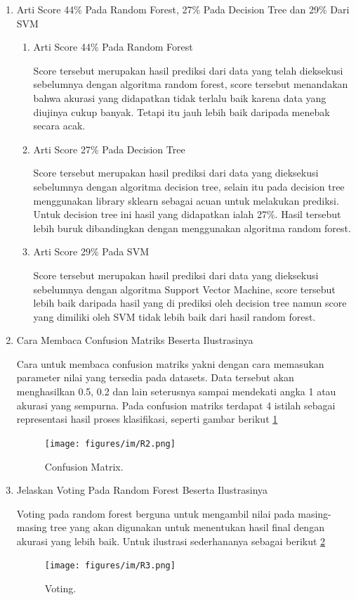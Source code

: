 \begin{enumerate}
\item Arti Score 44\% Pada Random Forest, 27\% Pada Decision Tree dan 29\% Dari SVM \par
\begin{enumerate}
\item Arti Score 44\% Pada Random Forest \par
Score tersebut merupakan hasil prediksi dari data yang telah dieksekusi sebelumnya dengan algoritma random forest, score tersebut menandakan bahwa akurasi yang didapatkan tidak terlalu baik karena data yang diujinya cukup banyak. Tetapi itu jauh lebih baik daripada menebak secara acak.
\item Arti Score 27\% Pada Decision Tree \par
Score tersebut merupakan hasil prediksi dari data yang dieksekusi sebelumnya dengan algoritma decision tree, selain itu pada decision tree menggunakan library sklearn sebagai acuan untuk melakukan prediksi. Untuk decision tree ini hasil yang didapatkan ialah 27\%. Hasil tersebut lebih buruk dibandingkan dengan menggunakan algoritma random forest.
\item Arti Score 29\% Pada SVM \par
Score tersebut merupakan hasil prediksi dari data yang dieksekusi sebelumnya dengan algoritma Support Vector Machine, score tersebut lebih baik daripada hasil yang di prediksi oleh decision tree namun score yang dimiliki oleh SVM tidak lebih baik dari hasil random forest.
\end{enumerate}

\item Cara Membaca Confusion Matriks Beserta Ilustrasinya \par
Cara untuk membaca confusion matriks yakni dengan cara memasukan parameter nilai yang tersedia pada datasets. Data tersebut akan  menghasilkan 0.5, 0.2 dan lain seterusnya sampai mendekati angka 1 atau akurasi yang sempurna. Pada confusion matriks terdapat 4 istilah sebagai representasi hasil proses klasifikasi, seperti gambar berikut \ref{R2}
		\begin{figure}[ht]
		\centerline{\texttt{[image: figures/im/R2.png]}}
		\caption{Confusion Matrix.}
		\label{R2}
		\end{figure}

\item Jelaskan Voting Pada Random Forest Beserta Ilustrasinya \par
Voting pada random forest berguna untuk mengambil nilai pada masing-masing tree yang akan digunakan untuk menentukan hasil final dengan akurasi yang lebih baik. Untuk ilustrasi sederhananya sebagai berikut \ref{R3}
		\begin{figure}[ht]
		\centerline{\texttt{[image: figures/im/R3.png]}}
		\caption{Voting.}
		\label{R3}
		\end{figure}
\end{enumerate}





